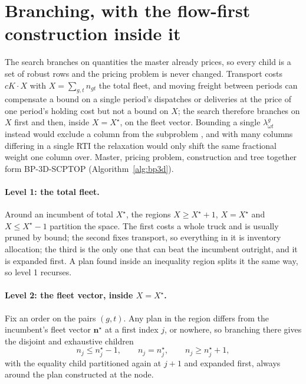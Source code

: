 \section{Branching, with the flow-first construction inside it}
\label{sec:branching}

The search branches on quantities the master already prices, so every
child is a set of robust rows and the pricing problem is never changed.
Transport costs $cK\cdot X$ with $X=\sum_{g,t}n_{gt}$ the total fleet,
and moving freight between periods can compensate a bound on a single
period's dispatches or deliveries at the price of one period's holding
cost but not a bound on $X$; the search therefore branches on $X$ first
and then, inside $X=X^{\star}$, on the fleet vector. Bounding a single
$\lambda^{g}_{\omega t}$ instead would exclude a column from the
subproblem \autocite{Vanderbeck2000OnIntegerProgramming}, and with
many columns differing in a single RTI the relaxation would only shift
the same fractional weight one column over. Master, pricing problem,
construction and tree together form BP-3D-SCPTOP
(Algorithm~\ref{alg:bp3d}).

\paragraph{Level 1: the total fleet.}
Around an incumbent of total $X^{\star}$, the regions
$X\ge X^{\star}+1$, $X=X^{\star}$ and $X\le X^{\star}-1$ partition the
space. The first costs a whole truck and is usually pruned by bound;
the second fixes transport, so everything in it is inventory
allocation; the third is the only one that can beat the incumbent
outright, and it is expanded first. A plan found inside an inequality
region splits it the same way, so level 1 recurses.

\paragraph{Level 2: the fleet vector, inside $X=X^{\star}$.}
Fix an order on the pairs $(g,t)$. Any plan in the region differs from
the incumbent's fleet vector $\mathbf{n}^{\star}$ at a first index $j$,
or nowhere, so branching there gives the disjoint and exhaustive
children
\begin{equation}
n_{j}\le n^{\star}_{j}-1,
\qquad
n_{j}= n^{\star}_{j},
\qquad
n_{j}\ge n^{\star}_{j}+1,
\label{eq:murty}
\end{equation}
with the equality child partitioned again at $j+1$
\autocite{Murty1968AnAlgorithm} and expanded first, always around the
plan constructed at the node.


